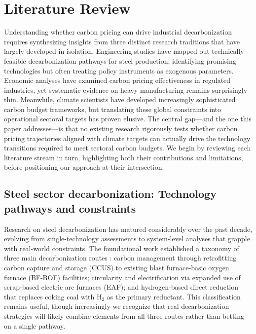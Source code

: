 \section{Literature Review}

Understanding whether carbon pricing can drive industrial decarbonization requires synthesizing insights from three distinct research traditions that have largely developed in isolation. Engineering studies have mapped out technically feasible decarbonization pathways for steel production, identifying promising technologies but often treating policy instruments as exogenous parameters. Economic analyses have examined carbon pricing effectiveness in regulated industries, yet systematic evidence on heavy manufacturing remains surprisingly thin. Meanwhile, climate scientists have developed increasingly sophisticated carbon budget frameworks, but translating these global constraints into operational sectoral targets has proven elusive. The central gap—and the one this paper addresses—is that no existing research rigorously tests whether carbon pricing trajectories aligned with climate targets can actually drive the technology transitions required to meet sectoral carbon budgets. We begin by reviewing each literature stream in turn, highlighting both their contributions and limitations, before positioning our approach at their intersection.

\subsection{Steel sector decarbonization: Technology pathways and constraints}

Research on steel decarbonization has matured considerably over the past decade, evolving from single-technology assessments to system-level analyses that grapple with real-world constraints. The foundational work established a taxonomy of three main decarbonization routes \citep{IEA2020steel}: carbon management through retrofitting carbon capture and storage (CCUS) to existing blast furnace-basic oxygen furnace (BF-BOF) facilities; circularity and electrification via expanded use of scrap-based electric arc furnaces (EAF); and hydrogen-based direct reduction that replaces coking coal with H$_2$ as the primary reductant. This classification remains useful, though increasingly we recognize that real decarbonization strategies will likely combine elements from all three routes rather than betting on a single pathway.

